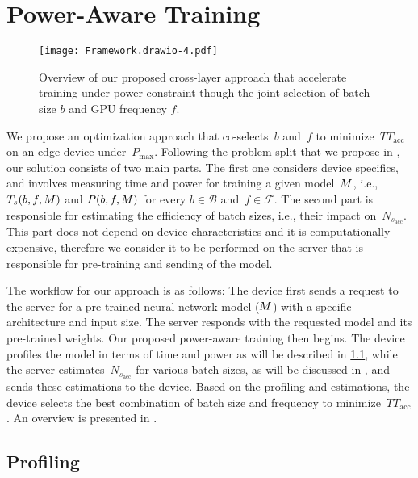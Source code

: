 \section{Power-Aware Training}
\label{sec:methodology}

\begin{figure*}[!t]
    \centering
     \resizebox{0.9\textwidth}{0.46\textwidth}
    {

    \texttt{[image: Framework.drawio-4.pdf]}
    }
    
    \caption{Overview of our proposed cross-layer approach that accelerate training under power constraint though the joint selection of batch size $b$ and GPU frequency $f$.} 
    \label{fig:overview_figure}
\end{figure*}

We propose an optimization approach that co-selects~$b$ and~$f$ to minimize~$TT_\text{acc}$ on an edge device under~$P_\text{max}$. 
Following the problem split that we propose in , our solution consists of two main parts. The first one considers device specifics, and involves measuring time and power for training a given model~$M$, i.e., $T_{s}(b, f, M)$ and $P(b, f, M)$ for every $b\in\mathcal{B}$ and~$f\in\mathcal{F}$.
The second part is responsible for estimating the efficiency of batch sizes, i.e., their impact on~$N_{s_{\text{acc}}}$. This part does not depend on device characteristics and it is computationally expensive, therefore we consider it to be performed on the server that is responsible for pre-training and sending of the model. 

The workflow for our approach is as follows: The device first sends a request to the server for a pre-trained neural network model ($M$) with a specific architecture and input size. The server responds with the requested model and its pre-trained weights. Our proposed power-aware training then begins. The device profiles the model in terms of time and power as will be described in \cref{subsec:profiling}, while the server estimates~$N_{s_{\text{acc}}}$ for various batch sizes, as will be discussed in , and sends these estimations to the device. Based on the profiling and estimations, the device selects the best combination of batch size and frequency to minimize~$TT_\text{acc}$. An overview is presented in . 






\subsection{Profiling} \label{subsec:profiling}


